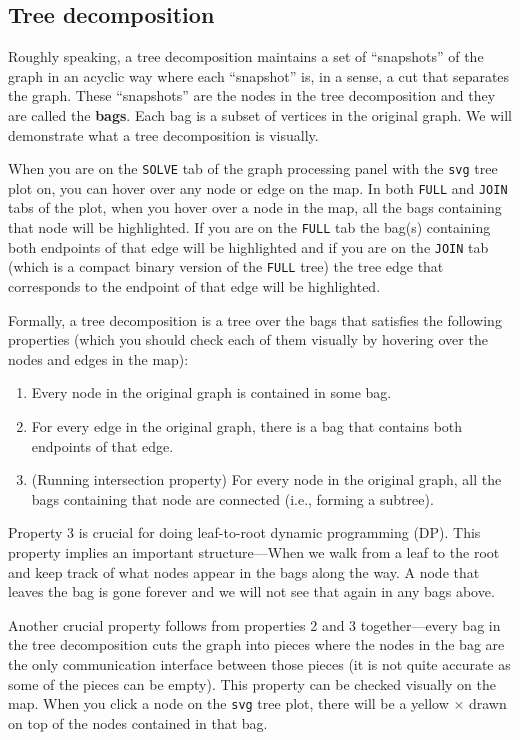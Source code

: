 \documentclass[11pt]{article}
\theoremstyle{definition}
\theoremstyle{remark}
\begin{document}
\subsection{Tree decomposition}
Roughly speaking, a tree decomposition maintains a set of ``snapshots'' of the graph in an acyclic way where each ``snapshot'' is, in a sense, a cut that separates the graph. These ``snapshots'' are the nodes in the tree decomposition and they are called the \textbf{bags}. Each bag is a subset of vertices in the original graph. We will demonstrate what a tree decomposition is visually. 

When you are on the \texttt{SOLVE} tab of the graph processing panel with the \texttt{svg} tree plot on, you can hover over any node or edge on the map. In both \texttt{FULL} and \texttt{JOIN} tabs of the plot, when you hover over a node in the map, all the bags containing that node will be highlighted. If you are on the \texttt{FULL} tab the bag(s) containing both endpoints of that edge will be highlighted and if you are on the \texttt{JOIN} tab (which is a compact binary version of the \texttt{FULL} tree) the tree edge that corresponds to the endpoint of that edge will be highlighted.

Formally, a tree decomposition is a tree over the bags that satisfies the following properties (which you should check each of them visually by hovering over the nodes and edges in the map):

\begin{enumerate}
    \item Every node in the original graph is contained in some bag.

    \item For every edge in the original graph, there is a bag that contains both endpoints of that edge.

    \item (Running intersection property) For every node in the original graph, all the bags containing that node are connected (i.e., forming a subtree).
\end{enumerate}


Property 3 is crucial for doing leaf-to-root dynamic programming (DP). This property implies an important structure---When we walk from a leaf to the root and keep track of what nodes appear in the bags along the way. A node that leaves the bag is gone forever and we will not see that again in any bags above.


Another crucial property follows from properties 2 and 3 together---every bag in the tree decomposition cuts the graph into pieces where the nodes in the bag are the only communication interface between those pieces (it is not quite accurate as some of the pieces can be empty). This property can be checked visually on the map. When you click a node on the \texttt{svg} tree plot, there will be a yellow $\times$ drawn on top of the nodes contained in that bag.
\end{document}
